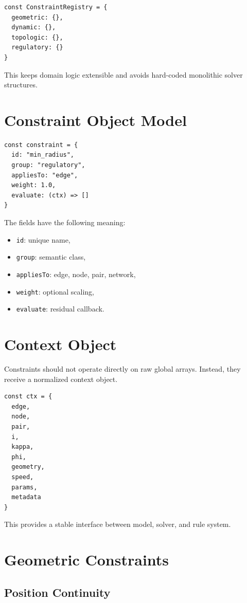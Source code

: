 \begin{verbatim}
const ConstraintRegistry = {
  geometric: {},
  dynamic: {},
  topologic: {},
  regulatory: {}
}
\end{verbatim}

This keeps domain logic extensible and avoids hard-coded monolithic
solver structures.

\section{Constraint Object Model}

\begin{verbatim}
const constraint = {
  id: "min_radius",
  group: "regulatory",
  appliesTo: "edge",
  weight: 1.0,
  evaluate: (ctx) => []
}
\end{verbatim}

The fields have the following meaning:
\begin{itemize}
\item \texttt{id}: unique name,
\item \texttt{group}: semantic class,
\item \texttt{appliesTo}: edge, node, pair, network,
\item \texttt{weight}: optional scaling,
\item \texttt{evaluate}: residual callback.
\end{itemize}

\section{Context Object}

Constraints should not operate directly on raw global arrays.
Instead, they receive a normalized context object.

\begin{verbatim}
const ctx = {
  edge,
  node,
  pair,
  i,
  kappa,
  phi,
  geometry,
  speed,
  params,
  metadata
}
\end{verbatim}

This provides a stable interface between model, solver, and rule system.

\section{Geometric Constraints}

\subsection{Position Continuity}

